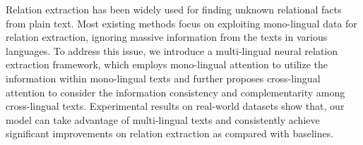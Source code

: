 Relation extraction has been widely used for finding unknown relational facts from plain text. Most existing methods focus on exploiting mono-lingual data for relation extraction, ignoring massive information from the texts in various languages. To address this issue, we introduce a multi-lingual neural relation extraction framework, which employs mono-lingual attention to utilize the information within mono-lingual texts and further proposes cross-lingual attention to consider the information consistency and complementarity among cross-lingual texts. Experimental results on real-world datasets show that, our model can take advantage of multi-lingual texts and consistently achieve significant improvements on relation extraction as compared with baselines.
